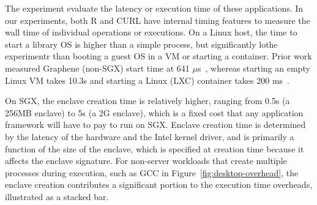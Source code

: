 The experiment evaluate the latency or execution time of these applications. 
In our experiments, both R and CURL have internal timing features to measure the wall time
of individual operations or executions.
On a Linux host, the time to start a library OS is higher than a simple 
process, but significantly lothe experimentr than booting a guest OS in a VM or
starting a container. 
Prior work measured Graphene (non-SGX) start time at 641 $\mu$s~\cite{tsai14graphene}, whereas starting an empty Linux VM takes 10.3s and starting a Linux (LXC) container takes 200 ms~\cite{agarwal15container}. 


On SGX, the enclave creation time is relatively higher,  ranging from 0.5s (a 256MB enclave) to 5s (a 2G enclave), which is a fixed cost that any application framework
will have to pay to run on SGX.
Enclave creation time is determined by the latency of the hardware and the Intel kernel driver, and is primarily a function of the size of 
the enclave, which is specified at creation time because it affects the enclave signature. %
For non-server workloads that create multiple processes during execution,
such as GCC in Figure~\ref{fig:desktop-overhead},
the enclave creation contributes a significant portion to the execution time overheads, illustrated as a stacked bar.

